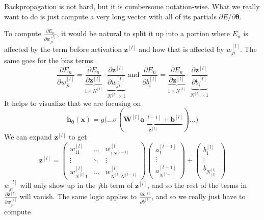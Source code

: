   Backpropagation is not hard, but it is cumbersome notation-wise. What we really want to do is just compute a very long vector with all of its partials $\partial E / \partial \boldsymbol{\theta}$. 

  \begin{algo}[Backpropagation]
    To compute $\frac{\partial E_n}{\partial w_{ji}^{[l]}}$, it would be natural to split it up into a portion where $E_n$ is affected by the term before activation $\mathbf{z}^{[l]}$ and how that is affected by $w_{ji}^{[l]}$. The same goes for the bias terms. 
    \begin{equation}
      \frac{\partial E_n}{\partial w_{ji}^{[l]}} = \underbrace{\frac{\partial E_n}{\partial \mathbf{z}^{[l]}}}_{1 \times N^{[l]}} \cdot \underbrace{\frac{\partial \mathbf{z}^{[l]}}{\partial w_{ji}^{[l]}}}_{N^{[l]} \times 1} \text{ and } \frac{\partial E_n}{\partial b_{i}^{[l]}} = \underbrace{\frac{\partial E_n}{\partial \mathbf{z}^{[l]}}}_{1 \times N^{[l]}} \cdot \underbrace{\frac{\partial \mathbf{z}^{[l]}}{\partial b_{i}^{[l]}}}_{N^{[l]} \times 1}
    \end{equation}
    It helps to visualize that we are focusing on 
    \begin{equation}
      \mathbf{h}_{\boldsymbol{\theta}} (\mathbf{x}) = g\big( \ldots \sigma( \underbrace{\mathbf{W}^{[l]} \mathbf{a}^{[l-1]} + \mathbf{b}^{[l]}}_{\mathbf{z}^{[l]}} )  \ldots \big)
    \end{equation}
    We can expand $\mathbf{z}^{[l]}$ to get 
    \begin{equation}
      \mathbf{z}^{[l]} = \begin{pmatrix} w_{11}^{[l]} & \ldots & w_{1 N^{[l-1]}}^{[l]} \\ \vdots & \ddots & \vdots \\ w_{N^{[l]} 1}^{[l]} & \ldots & w_{N^{[l]} N^{[l-1]}}^{[l]} \end{pmatrix} 
      \begin{pmatrix} a^{[l-1]}_1 \\ \vdots \\ a^{[l-1]}_{N^{[l-1]}} \end{pmatrix} + \begin{pmatrix} b_1^{[l]} \\ \vdots \\ b_{N^{[l]}_{[l]}} \end{pmatrix}
    \end{equation}
    $w_{ji}^{[l]}$ will only show up in the $j$th term of $\mathbf{z}^{[l]}$, and so the rest of the terms in $\frac{\partial \mathbf{z}^{[l]}}{\partial w_{ji}^{[l]}}$ will vanish. The same logic applies to $\frac{\partial \mathbf{z}^{[l]}}{\partial b_{i}^{[l]}}$, and so we really just have to compute 

\end{algo}
